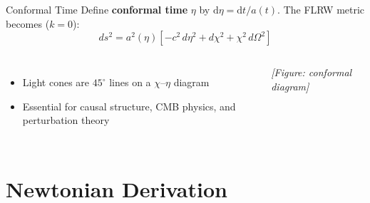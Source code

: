 \documentclass[aspectratio=169,11pt]{beamer}
\newcommand{\dd}{\mathrm{d}}
\begin{document}
\begin{frame}{Conformal Time}
Define \textbf{conformal time} $\eta$ by $\dd\eta = \dd t/a(t)$. The FLRW metric becomes ($k=0$):
\begin{equation*}
    ds^2 = a^2(\eta)\!\left[-c^2\,d\eta^2 + d\chi^2 + \chi^2\,d\Omega^2\right]
\end{equation*}

\begin{columns}[T]
\begin{itemize}
    \item Light cones are $45^\circ$ lines on a $\chi$--$\eta$ diagram
    \item Essential for causal structure, CMB physics, and perturbation theory
\end{itemize}

\begin{center}
\textit{[Figure: conformal diagram]}
\end{center}
\end{columns}
\end{frame}


\section{Newtonian Derivation}
\end{document}
